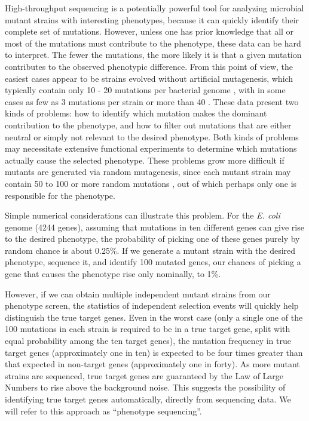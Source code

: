 \documentclass[letterpaper,10pt,english]{howto}
\begin{document}
High-throughput sequencing is a potentially powerful tool
for analyzing microbial mutant strains with interesting phenotypes,
because it can quickly identify their complete set of mutations.
However, unless one has prior knowledge
that all or most of the mutations must contribute to the phenotype,
these data can be hard to interpret.
The fewer the mutations, the more likely it is that a given mutation
contributes to the observed phenotypic difference.  From this
point of view, the easiest cases appear to be strains evolved without
artificial mutagenesis, which typically contain only 10 - 20 mutations
per bacterial genome
\cite{Honisch2004}  \cite{Velicer2006}  \cite{Smith2008} 
\cite{Klockgether2010}  \cite{LeePalsson2010}  \cite{Chen2010} ,
with in some cases as few as 3 mutations per strain
\cite{Herring2006}  \cite{Conrad2009}  or more than
40 \cite{Srivatsan2009} .
These data present two kinds of problems: how to
identify which mutation makes the dominant contribution to
the phenotype, and how to filter out mutations that are either
neutral or simply not relevant to the desired phenotype.
Both kinds of problems may necessitate extensive
functional experiments to determine which mutations actually
cause the selected phenotype.
These problems grow more difficult
if mutants are generated via random mutagenesis, since
each mutant strain may contain 50 to 100 or more random mutations
\cite{Ohnishi2008}  \cite{LeCrom2009} , out of
which perhaps only one is responsible for the phenotype.

Simple numerical considerations can illustrate this problem.
For the \emph{E. coli} genome (4244 genes), assuming that mutations
in ten different genes can give rise to the desired phenotype,
the probability of picking one of these genes purely by random chance
is about 0.25\%.  If we generate a mutant strain with the desired
phenotype, sequence it, and identify 100 mutated genes, our
chances of picking a gene that causes the phenotype rise only
nominally, to 1\%.

However, if we can obtain multiple independent
mutant strains from our phenotype screen, the statistics of
independent selection events will quickly help distinguish the
true target genes.  Even in the worst case
(only a single one of the 100 mutations in each strain
is required to be in a true target gene, split with equal
probability among the ten target genes), the mutation
frequency in true target genes (approximately one in ten) is expected
to be four times greater than that expected in non-target
genes (approximately one in forty).  As more mutant strains are sequenced,
true target genes are guaranteed by
the Law of Large Numbers to rise above the background noise.
This suggests the possibility of identifying true target genes
automatically, directly from sequencing data.
We will refer to this approach as ``phenotype sequencing''.
\end{document}
